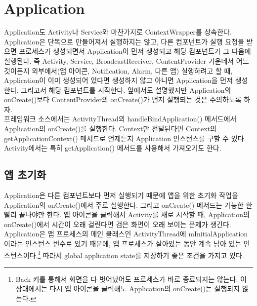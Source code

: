 \chapter{Application}
Application도 Activity나 Service와 마찬가지로 ContextWrapper를 상속한다.
Application은 단독으로 만들어져서 실행하지는 않고, 다른 컴포넌트가 실행 요청을 받으면 프로세스가 생성되면서 Application이 먼저 생성되고 해당 컴포넌트가 그 다음에 실행된다. 
즉 Activity, Service, BroadcastReceiver, ContentProvider 가운데서 어느 것이든지 외부에서(앱 아이콘, Notification, Alarm, 다른 앱) 실행하려고 할 때, Application이 이미 생성되어 있다면 생성하지 않고 아니면 Application을 먼저 생성한다. 그리고서 해당 컴포넌트를 시작한다. 
앞에서도 설명했지만 Application의 onCreate()보다 ContentProvider의 onCreate()가 먼저 실행되는 것은 주의하도록 하자.\\

프레임워크 소스에서는 ActivityThread의 handleBindApplication() 메서드에서 Application의 onCreate()를 실행한다.
Context만 전달된다면 Context의 getApplicationContext() 메서드로 언제든지 Application 인스턴스를 구할 수 있다. 
Activity에서는 특히 getApplication() 메서드를 사용해서 가져오기도 한다.

\section{앱 초기화}
Application은 다른 컴포넌트보다 먼저 실행되기 때문에 앱을 위한 초기화 작업을 Application의 onCreate()에서 주로 실행한다.
그리고 onCreate() 메서드는 가능한 한 빨리 끝나야만 한다. 
앱 아이콘을 클릭해서 Activity를 새로 시작할 때, Application의 onCreate()에서 시간이 오래 걸린다면 검은 화면이 오래 보이는 문제가 생긴다.\\

Application은 앱 프로세스의 메인 클래스인 ActivityThread에 mInitialApplication이라는 인스턴스 변수로 있기 때문에, 앱 프로세스가 살아있는 동안 계속 남아 있는 인스턴스이다.\footnote{Back 키를 통해서 화면을 다 벗어났어도 프로세스가 바로 종료되지는 않는다. 이 상태에서는 다시 앱 아이콘을 클릭해도 Application의 onCreate()는 실행되지 않는다.}
따라서 global application state를 저장하기 좋은 조건을 가지고 있다.\\

